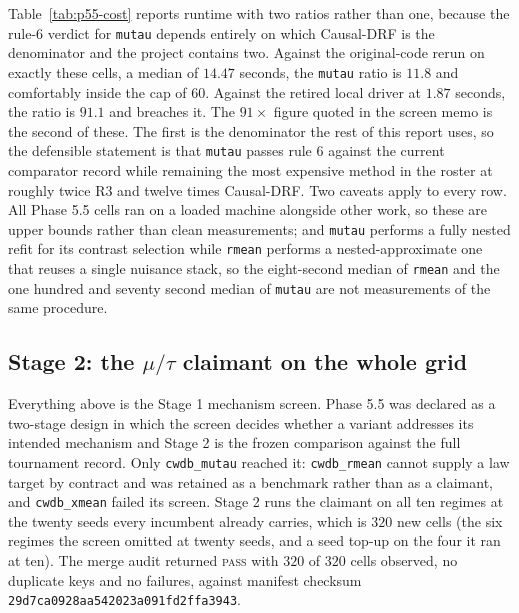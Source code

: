 Table~\ref{tab:p55-cost} reports runtime with two ratios rather than one,
because the rule-6 verdict for \texttt{mutau} depends entirely on which
Causal-DRF is the denominator and the project contains two. Against the
original-code rerun on exactly these cells, a median of $14.47$ seconds, the
\texttt{mutau} ratio is $11.8$ and comfortably inside the cap of $60$. Against
the retired local driver at $1.87$ seconds, the ratio is $91.1$ and breaches it.
The $91\times$ figure quoted in the screen memo is the second of these. The
first is the denominator the rest of this report uses, so the defensible
statement is that \texttt{mutau} passes rule 6 against the current comparator
record while remaining the most expensive method in the roster at roughly twice
R3 and twelve times Causal-DRF. Two caveats apply to every row. All Phase 5.5
cells ran on a loaded machine alongside other work, so these are upper bounds
rather than clean measurements; and \texttt{mutau} performs a fully nested
refit for its contrast selection while \texttt{rmean} performs a
nested-approximate one that reuses a single nuisance stack, so the eight-second
median of \texttt{rmean} and the one hundred and seventy second median of
\texttt{mutau} are not measurements of the same procedure.

\subsection{Stage 2: the \texorpdfstring{$\mu/\tau$}{mu/tau} claimant on the whole grid}
\label{sub:stage2}

Everything above is the Stage 1 mechanism screen. Phase 5.5 was declared as a
two-stage design in which the screen decides whether a variant addresses its
intended mechanism and Stage 2 is the frozen comparison against the full
tournament record. Only \texttt{cwdb\_mutau} reached it: \texttt{cwdb\_rmean}
cannot supply a law target by contract and was retained as a benchmark rather
than as a claimant, and \texttt{cwdb\_xmean} failed its screen. Stage 2 runs the
claimant on all ten regimes at the twenty seeds every incumbent already carries,
which is $320$ new cells (the six regimes the screen omitted at twenty seeds,
and a seed top-up on the four it ran at ten). The merge audit returned
\textsc{pass} with $320$ of $320$ cells observed, no duplicate keys and no
failures, against manifest checksum
\texttt{29d7ca09\allowbreak 28aa5420\allowbreak 23a091fd\allowbreak 2ffa3943}.

